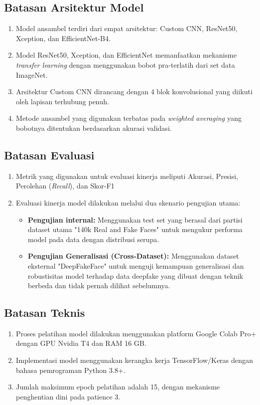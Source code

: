 \subsection{Batasan Arsitektur Model}
\begin{enumerate}
\item Model ansambel terdiri dari empat arsitektur: Custom CNN, ResNet50, Xception, dan EfficientNet-B4.

\item Model ResNet50, Xception, dan EfficientNet memanfaatkan mekanisme \textit{transfer learning} dengan menggunakan bobot pra-terlatih dari set data ImageNet.

\item Arsitektur Custom CNN dirancang dengan 4 blok konvolusional yang diikuti oleh lapisan terhubung penuh.

\item Metode ansambel yang digunakan terbatas pada \textit{weighted averaging} yang bobotnya ditentukan berdasarkan akurasi validasi.
\end{enumerate}

\subsection{Batasan Evaluasi}
\begin{enumerate}
\item Metrik yang digunakan untuk evaluasi kinerja meliputi Akurasi, Presisi, Perolehan (\textit{Recall}), dan Skor-F1

\item Evaluasi kinerja model dilakukan melalui dua skenario pengujian utama:
\begin{itemize}
    \item \textbf{Pengujian internal:} Menggunakan test set yang berasal dari partisi dataset utama "140k Real and Fake Faces" untuk mengukur performa model pada data dengan distribusi serupa.
    \item \textbf{Pengujian Generalisasi (Cross-Dataset):} Menggunakan dataset eksternal "DeepFakeFace" untuk menguji kemampuan generalisasi dan robustisitas model terhadap data deepfake yang dibuat dengan teknik berbeda dan tidak pernah dilihat sebelumnya.
\end{itemize}
\end{enumerate}

\subsection{Batasan Teknis}
\begin{enumerate}
\item Proses pelatihan model dilakukan menggunakan platform Google Colab Pro+ dengan GPU Nvidia T4 dan RAM 16 GB.

\item Implementasi model menggunakan kerangka kerja TensorFlow/Keras dengan bahasa pemrograman Python 3.8+.

\item Jumlah maksimum epoch pelatihan adalah 15, dengan mekanisme penghentian dini pada patience 3.
\end{enumerate}

